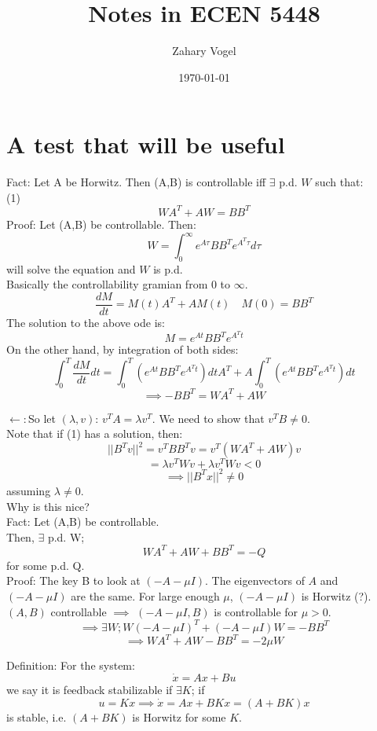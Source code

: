\documentclass{article}
\author{Zahary Vogel}
\date{\today}
\title{Notes in ECEN 5448}
\begin{document}
\maketitle


\section{A test that will be useful}
Fact: Let A be Horwitz. Then (A,B) is controllable iff $\exists$ p.d. $W$ such that:\\
(1)\\
\[WA^T+AW=BB^T\]
Proof: Let (A,B) be controllable. Then:
\[W=\int_0^\infty e^{A\tau}BB^Te^{A^T\tau}d\tau\]
will solve the equation and $W$ is p.d.\\
Basically the controllability gramian from 0 to $\infty$.\\
\[\frac{dM}{dt}=M(t)A^T+AM(t)\quad M(0)=BB^T\]
The solution to the above ode is:
\[M=e^{At}BB^Te^{A^Tt}\]
On the other hand, by integration of both sides:\\
\[\int_0^T\frac{dM}{dt}dt=\int_0^T(e^{At}BB^Te^{A^Tt})dtA^T+A\int_0^T(e^{At}BB^Te^{A^Tt})dt\]
\[\implies -BB^T=WA^T+AW\]

$\leftarrow :$So let $(\lambda,v)$: $v^TA=\lambda v^T$. We need to show that $v^TB\neq 0$.\\

Note that if (1) has a solution, then:\\
\[\lvert\lvert B^Tv\rvert\rvert^2=v^TBB^Tv=v^T(WA^T+AW)v\]
\[=\lambda v^TWv+\lambda v^TWv<0\]
\[\implies \lvert\lvert B^Tx\rvert\rvert^2\neq 0\]
assuming $\lambda\neq 0$.\\

Why is this nice?\\
Fact: Let (A,B) be controllable.\\
Then, $\exists$ p.d. W;\\
\[WA^T+AW+BB^T=-Q\]
for some p.d. Q.\\

Proof: The key B to look at $(-A-\mu I)$. The eigenvectors of $A$ and $(-A-\mu I)$ are the same. For large enough $\mu$, $(-A-\mu I)$ is Horwitz (?).\\
$(A,B)$ controllable $\implies$ $(-A-\mu I,B)$ is controllable for $\mu>0$.\\
\[\implies \exists W; W(-A-\mu I)^T+(-A-\mu I)W=-BB^T\]
\[\implies WA^T+AW-BB^T=-2\mu W\]

Definition: For the system:\\
\[\dot{x}=Ax+Bu\]
we say it is feedback stabilizable if $\exists K$; if\\
\[u=Kx\implies \dot{x}=Ax+BKx=(A+BK)x\]
is stable, i.e. $(A+BK)$ is Horwitz for some $K$.\\
\end{document}

